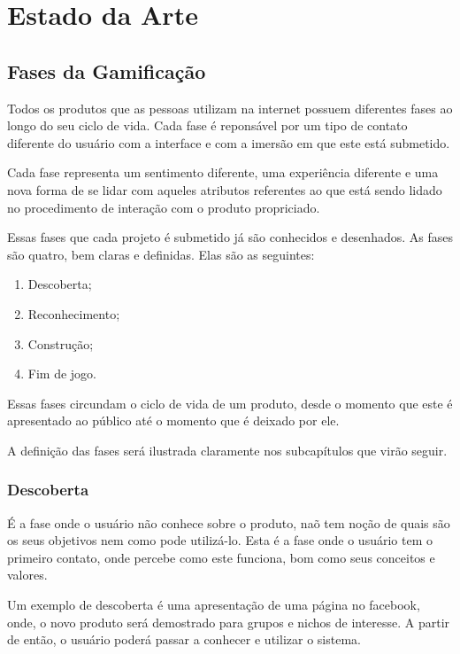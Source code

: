 \chapter[Estado da Arte]{Estado da Arte}

\section{Fases da Gamificação}
\label{sub:fasesgamification}
Todos os produtos que as pessoas utilizam na internet possuem diferentes
fases ao longo do seu ciclo de vida. Cada fase é reponsável por um tipo de contato diferente 
do usuário com a interface e com a imersão em que este está submetido.

Cada fase representa um sentimento diferente, uma experiência diferente
e uma nova forma de se lidar com aqueles atributos referentes ao que está
sendo lidado no procedimento de interação com o produto propriciado.

Essas fases que cada projeto é submetido já são conhecidos e desenhados. As fases
são quatro, bem claras e definidas. Elas são as seguintes:

\begin{enumerate}
    \item Descoberta;
    \item Reconhecimento;
    \item Construção;
    \item Fim de jogo.
\end{enumerate}

Essas fases circundam o ciclo de vida de um produto, desde o momento que este
é apresentado ao público até o momento que é deixado por ele. 

A definição das fases será ilustrada claramente nos subcapítulos que virão seguir.

\subsection{Descoberta}
\label{sub:descoperta}
É a fase onde o usuário não conhece sobre o produto, naõ tem noção de quais são os
seus objetivos nem como pode utilizá-lo. Esta é a fase onde o usuário tem o primeiro
contato, onde percebe como este funciona, bom como seus conceitos e valores.

Um exemplo de descoberta é uma apresentação de uma página no facebook, onde,
o novo produto será demostrado para grupos e nichos de interesse. A partir
de então, o usuário poderá passar a conhecer e utilizar o sistema.

